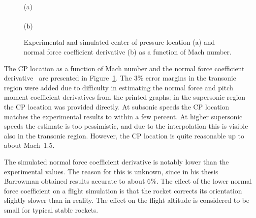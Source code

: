 \begin{figure}
\centering
{} \\
(a) \\
 \\
(b)
\caption{Experimental and simulated center of pressure location (a)
  and normal force coefficient derivative (b) as a function of Mach
  number.}
\label{fig-experimental-CP-CNa}
\end{figure}

The CP location as a function of Mach number and the normal force
coefficient derivative \CNa\ are presented in
Figure~\ref{fig-experimental-CP-CNa}.  The 3\% error margins in the
transonic region were added due to difficulty in estimating the normal
force and pitch moment coefficient derivatives from the printed
graphs; in the supersonic region the CP location was provided
directly.  At subsonic speeds the CP location matches the experimental
results to within a few percent.  At higher supersonic speeds the
estimate is too pessimistic, and due to the interpolation this is
visible also in the transonic region.  However, the CP location is
quite reasonable up to about Mach~1.5.

The simulated normal force coefficient derivative is notably lower
than the experimental values.  The reason for this is unknown, since
in his thesis Barrowman obtained results accurate to about 6\%.  The
effect of the lower normal force coefficient on a flight simulation is
that the rocket corrects its orientation slightly slower than in
reality.  The effect on the flight altitude is considered to be small
for typical stable rockets.

